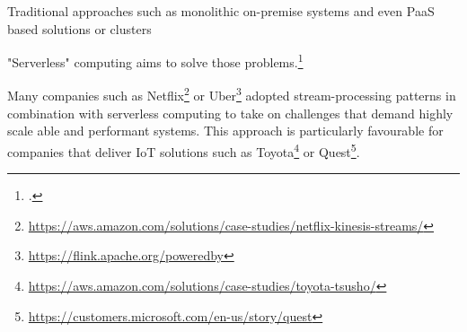Traditional approaches such as monolithic on-premise systems and even \acf{PaaS} based solutions or clusters  

"Serverless" computing aims to solve those problems.\footcite{Roberts2016ServerlessArchitectures}

Many companies such as Netflix\footnote{\url{https://aws.amazon.com/solutions/case-studies/netflix-kinesis-streams/}} or Uber\footnote{\url{https://flink.apache.org/poweredby}} adopted stream-processing patterns in combination with serverless computing to take on challenges that demand highly scale able and performant systems. 
This approach is particularly favourable for companies that deliver IoT solutions such as Toyota\footnote{\url{https://aws.amazon.com/solutions/case-studies/toyota-tsusho/}} or Quest\footnote{\url{https://customers.microsoft.com/en-us/story/quest}}.